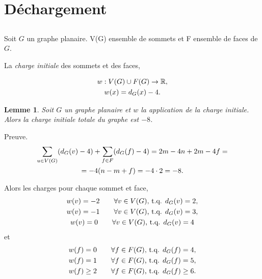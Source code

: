 \documentclass{beamer}
\newtheorem{lemme}{Lemme}
\begin{document}
%
% 
%

%

\section{Déchargement}
\subsection{ }
\begin{frame}
Soit $G$ un graphe planaire. V(G) ensemble de sommets et F ensemble de faces de $G$.

La \emph{charge initiale} des sommets et des faces,

$$
\gathered
w: V(G)\cup F(G) \to \mathbb{R}, \\
w(x) = d_G(x) - 4. \\
\endgathered
$$
\end{frame}

\begin{frame}
\begin{lemme}
Soit $G$ un graphe planaire et $w$ la application de la charge initiale. Alors la charge initiale totale du graphe est $-8$.
\end{lemme}

Preuve.
$$
\gathered
\sum_{u \in V(G)} (d_G(v) - 4) + \sum_{f \in F} (d_G(f) - 4) = 2m - 4n + 2m - 4f =\\
= -4( n - m + f) = -4 \cdot 2 = -8.
\endgathered
$$
\end{frame}

\begin{frame}
Alors les charges pour chaque sommet et face,
$$
\gathered
w(v) = -2 \qquad \forall v \in V(G) \textrm{,  t.q.  } d_G(v) = 2,\\
w(v) = -1 \qquad \forall v \in V(G) \textrm{,  t.q.  } d_G(v) = 3,\\
w(v) = 0 \qquad \forall  v \in V(G) \textrm{,  t.q.  } d_G(v) = 4
\endgathered
$$
et
$$
\gathered
w(f) = 0 \qquad \forall f \in F(G) \textrm{,  t.q.  } d_G(f) = 4,\\
w(f) = 1 \qquad \forall f \in F(G) \textrm{,  t.q.  } d_G(f) = 5,\\
w(f) \geq 2 \qquad \forall f \in F(G) \textrm{, t.q.  } d_G(f) \geq 6.
\endgathered
$$
\end{frame}
\end{document}
